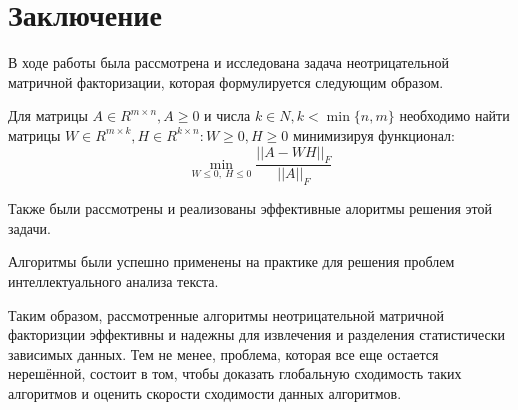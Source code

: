 
\chapter*{Заключение}

В ходе работы была рассмотрена и исследована задача неотрицательной матричной факторизации, которая формулируется следующим образом.

Для матрицы $A \in R^{m \times n}, A \geq 0$ и числа $k \in N, k < \min\{n, m\}$
необходимо найти матрицы $W \in R^{m \times k}, H \in R^{k \times n} : W \geq 0, H \geq 0$ минимизируя функционал:
\begin{equation*}
  \min_{W \leq 0, \ H \leq 0} \dfrac{||A - WH||_F}{|| A ||_F}
\end{equation*}

Также были рассмотрены и реализованы эффективные алоритмы решения этой задачи.

Алгоритмы были успешно применены на практике для решения проблем интеллектуального анализа текста.

Таким образом, рассмотренные алгоритмы неотрицательной матричной факторизции
эффективны и надежны для извлечения и разделения статистически зависимых данных.
Тем не менее, проблема, которая все еще остается нерешённой, состоит в том,
чтобы доказать глобальную сходимость таких алгоритмов и оценить скорости сходимости данных алгоритмов.

